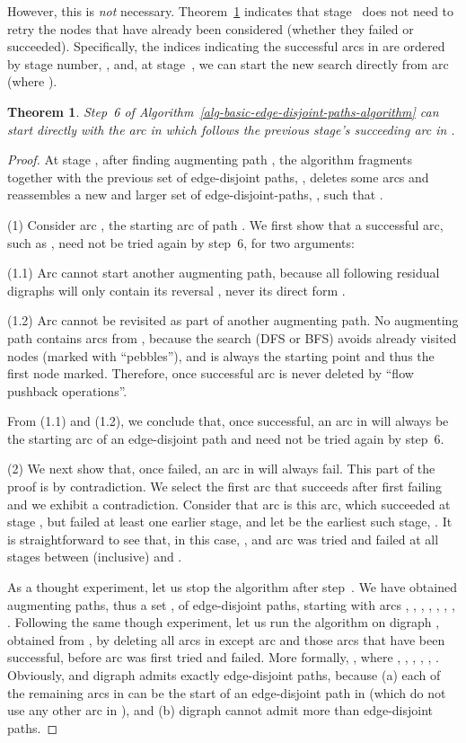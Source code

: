 \documentclass[preliminary,copyright,creativecommons]{eptcs}
\newtheorem{theorem}{Theorem}
\theoremstyle{remark}
\begin{document}
However, this is \emph{not} necessary.
Theorem~\ref{conjecture} indicates that stage~ does not need to retry 
the nodes that have already been considered (whether they failed or succeeded).
Specifically, the indices indicating the successful arcs in  are ordered by stage number,
, and, at stage~, 
we can start the new search directly from arc 
(where ). 

\begin{theorem}
\label{conjecture}
Step~6 of Algorithm~\ref{alg-basic-edge-disjoint-paths-algorithm} 
can start directly with the arc in  
which follows the previous stage's succeeding arc in .
\end{theorem}

\begin{proof}
At stage , after finding augmenting path , 
the algorithm fragments  
together with the previous set of edge-disjoint paths, , 
deletes some arcs and reassembles a new and larger set of edge-disjoint-paths, ,
such that .

(1) Consider arc , the starting arc of path .
We first show that a successful arc, such as , 
need not be tried again by step~6, for two arguments:

(1.1) Arc  cannot start another augmenting path, 
because all following residual digraphs will only contain 
its reversal , never its direct form .

(1.2) Arc  cannot be revisited as part of another augmenting path.
No augmenting path contains arcs from , 
because the search (DFS or BFS) avoids already visited nodes (marked with ``pebbles''), 
and  is always the starting point and thus the first node marked.
Therefore, once successful arc  is never deleted 
by ``flow pushback operations''.

From (1.1) and (1.2), we conclude that, once successful, an arc in  
will always be the starting arc of an edge-disjoint path
and need not be tried again by step~6.

\medskip

(2) We next show that, once failed, an arc in  will always fail.
This part of the proof is by contradiction.
We select the first arc that succeeds after first failing and we exhibit a contradiction.
Consider that arc  is this arc, which succeeded at stage ,
but failed at least one earlier stage, and let  be the earliest such stage, .
It is straightforward to see that, in this case, 
,
and arc  was tried and failed at all stages 
between  (inclusive) and .

As a thought experiment, let us stop the algorithm after step~.
We have obtained  augmenting paths, thus a set , of  edge-disjoint paths,
starting with arcs , , , 
, , , , .
Following the same though experiment, let us run the algorithm on 
digraph , obtained from , by deleting all arcs in  
except arc  and those arcs that have been successful, 
before arc  was first tried and failed.
More formally, , where
, 
, , , , .
Obviously,  and digraph  admits exactly  edge-disjoint paths, 
because
(a) each of the remaining arcs in  can be the start 
of an edge-disjoint path in  (which do not use any other arc in ), and  
(b) digraph  cannot admit more than  edge-disjoint paths.


\end{proof}
\end{document}
